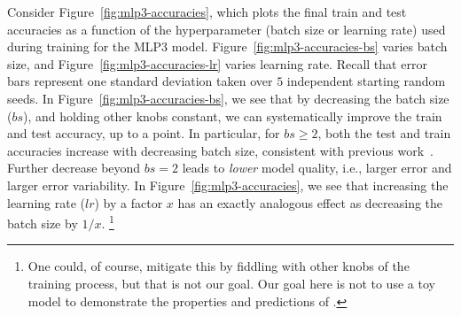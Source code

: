 Consider Figure~\ref{fig:mlp3-accuracies}, which plots the final train and test accuracies as a function of the hyperparameter (batch size or learning rate) used during training for the MLP3 model.
Figure~\ref{fig:mlp3-accuracies-bs} varies batch size, and Figure~\ref{fig:mlp3-accuracies-lr} varies learning rate.
Recall that error bars represent one standard deviation taken over $5$ independent starting random seeds. 
In Figure~\ref{fig:mlp3-accuracies-bs}, we see that by decreasing the batch size ($bs$), and holding other knobs constant, we can systematically improve the train and test accuracy, up to a point. 
In particular, for $bs \ge 2$, both the test and train accuracies increase with decreasing batch size, consistent with previous work~\cite{MM18_TR_JMLRversion}.
Further decrease beyond $bs=2$ leads to \emph{lower} model quality, i.e., larger error and larger error variability.
In Figure~\ref{fig:mlp3-accuracies}, we see that increasing the learning rate ($lr$) by a factor $x$ has an exactly analogous effect as decreasing the batch size by $1/x$.%
\footnote{One could, of course, mitigate this by fiddling with other knobs of the training process, but that is not our goal.  Our goal here is not to use a toy model to demonstrate the properties and predictions of \SETOL.}

